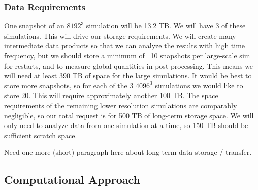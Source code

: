 \documentclass[11pt,letterpaper,english]{article}
\begin{document}
\subsubsection{Data Requirements}

One snapshot of an $8192^3$ simulation will be 13.2 TB. We will have 3 of these simulations. This will drive our storage requirements. We will create many intermediate data products so that we can analyze the results with high time frequency, but we should store a minimum of ~10 snapshots per large-scale sim for restarts, and to measure global quantities in post-processing. This means we will need at least 390 TB of space for the large simulations. It would be best to store more snapshots, so for each of the 3 $4096^3$ simulations we would like to store 20. This will require approximately another 100 TB. The space requirements of the remaining lower resolution simulations are comparably negligible, so our total request is for 500 TB of long-term storage space. We will only need to analyze data from one simulation at a time, so 150 TB should be sufficient scratch space.

Need one more (short) paragraph here about long-term data storage / transfer.

\vspace{-.25in}
\subsection{Computational Approach}
\vspace{-.2in}


\end{document}
